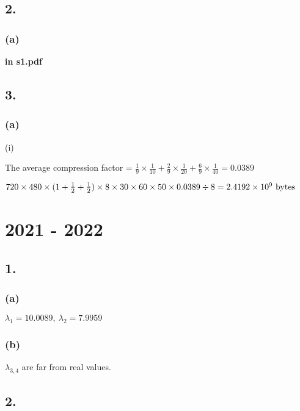 \documentclass{article}
\begin{document}
\subsection*{2.}
\subsubsection*{(a)}
\textbf{in s1.pdf}

\subsection*{3.}
\subsubsection*{(a)}
(i)\par
The average compression factor = $\frac{1}{9}\times \frac{1}{10}+\frac{2}{9}\times \frac{1}{20}+\frac{6}{9}\times \frac{1}{40}=0.0389$\par
$720 \times 480 \times (1+\frac{1}{2}+\frac{1}{2})\times 8 \times 30 \times 60 \times 50 \times 0.0389 \div 8=2.4192 \times 10^{9} \ {\rm bytes}$

\clearpage
\section*{2021 - 2022}
\subsection*{1.}
\subsubsection*{(a)}
$\lambda_{1}=10.0089, \ \lambda_{2}=7.9959$
\subsubsection*{(b)}
$\lambda_{3, 4}$ are far from real values.
\subsection*{2.}
\end{document}
